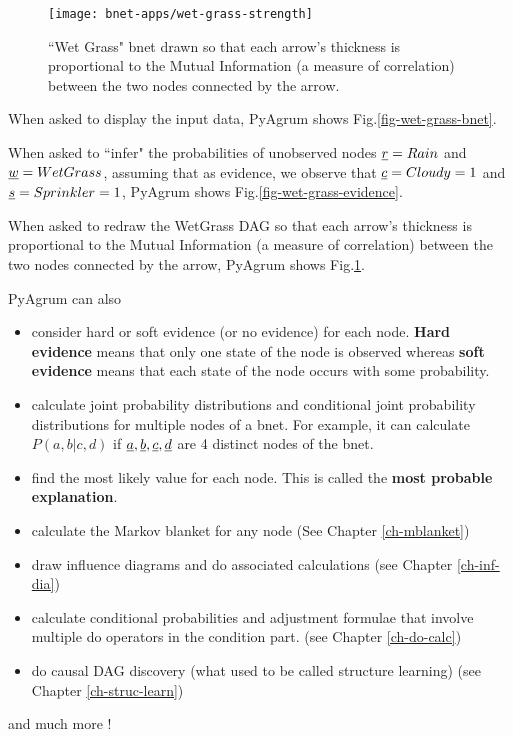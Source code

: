 \begin{figure}[h!]
\centering
\texttt{[image: bnet-apps/wet-grass-strength]}
\caption{``Wet Grass" bnet drawn so that each arrow's thickness
is proportional to the Mutual Information (a measure of
correlation) between the two nodes connected by the arrow.}
\label{fig-wet-grass-strength}
\end{figure}


When asked to display the input data, PyAgrum shows Fig.\ref{fig-wet-grass-bnet}.



When asked to ``infer" the probabilities of unobserved nodes ${\underline{r}}=Rain$
and ${\underline{w}}=WetGrass$,
assuming that as evidence, we observe that ${\underline{c}}=Cloudy=1$ and ${\underline{s}}=Sprinkler=1$, PyAgrum shows Fig.\ref{fig-wet-grass-evidence}.

When asked to redraw the WetGrass DAG so that each arrow's thickness
is proportional to the Mutual Information (a measure of
correlation) between the two nodes connected by the arrow,
PyAgrum shows Fig.\ref{fig-wet-grass-strength}.


PyAgrum can also  

\begin{itemize}

\item consider hard or soft evidence (or no evidence)
for each node. {\bf Hard evidence} means that only
one state of the node is observed whereas {\bf soft
evidence} means that each state of the node occurs with some probability.


\item calculate joint probability distributions and conditional joint probability distributions for multiple nodes of a bnet.
For example, it can calculate  $P(a,b|c,d)$ if ${\underline{a}}, {\underline{b}}, {\underline{c}}, {\underline{d}}$ 
are 4  distinct nodes of the bnet.


\item find
the most likely value for each node. This is called the {\bf most probable explanation}.

\item calculate the Markov blanket for any node (See Chapter \ref{ch-mblanket})

\item draw influence diagrams and do associated calculations (see Chapter \ref{ch-inf-dia})

\item calculate conditional probabilities and adjustment formulae  that involve multiple do operators in the condition part. (see Chapter \ref{ch-do-calc})
\item do causal DAG discovery (what used to be called structure learning) (see Chapter \ref{ch-struc-learn})

\end{itemize}
and much more !

